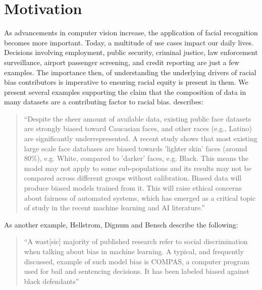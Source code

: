 \documentclass[conference]{IEEEtran}
\begin{document}
\section{Motivation}
As advancements in computer vision increase, the application of facial recognition becomes more important. Today, a multitude of use cases impact our daily lives. Decisions involving employment, public security, criminal justice, law enforcement surveillance, airport passenger screening, and credit reporting \cite{labati2016biometric,amos2016openface} are just a few examples. The importance then, of understanding the underlying drivers of racial bias contributors is imperative to ensuring racial equity is present in them. We present several examples supporting the claim that the composition of data in many datasets are a contributing factor to racial bias. \cite{karkkainen2021fairface} describes:
\begin{quote}
“Despite the sheer amount of available data, existing public face datasets are strongly biased toward Caucasian faces, and other races (e.g., Latino) are significantly underrepresented. A recent study shows that most existing large scale face databases are biased towards 'lighter skin' faces (around 80\%), e.g. White, compared to 'darker' faces, e.g. Black\cite{merler2019diversity}. This means the model may not apply to some sub-populations and its results may not be compared across different groups without calibration. Biased data will produce biased models trained from it. This will raise ethical concerns about fairness of automated systems, which has emerged as a critical topic of study in the recent machine learning and AI literature\cite{hardt2016equality,corbett2017algorithmic}.”
\end{quote}

As another example, Hellstrom, Dignum and Bensch \cite{hellstrom2020bias} describe the following: 

\begin{quote}
“A wast[sic] majority of published research refer to social discrimination when talking about bias in machine learning. A typical, and frequently discussed, example of such model bias is COMPAS, a computer program used for bail and sentencing decisions. It has been labeled biased against black defendants\cite{Angwin_Larson_Kirchner_Mattu_2016}”  
\end{quote}
\end{document}
